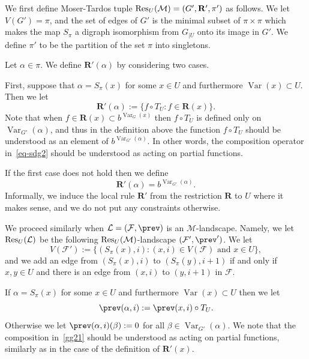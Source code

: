 \documentclass[12pt,a4paper]{article}
\numberwithin{equation}{section}
\theoremstyle{definition}
\newcommand{\al}{{\alpha}}
\newcommand{\be}{{\beta}}
\renewcommand{\cal}[1]{{\mathcal #1}}
\newcommand\Var{\operatorname{Var}}
\begin{document}
     We first define Moser-Tardos tuple $\Res_U(\cal M) = (G',\mathbf R', \pi')$ as follows. We let 
    $V(G')=\pi$, and the set of edges of $G'$ is the minimal subset of 
    $\pi\times \pi$ which makes the map $S_\pi$ a digraph isomorphism from 
    $G_{|U}$ onto its image in $G'$. We define $\pi'$ to be the partition of the set $\pi$ into singletons.
    
    Let $\al\in \pi$. We define $\mathbf R'(\al)$ by considering two cases. 
    
    First, suppose that $\al= S_\pi(x)$ for some $x\in U$ and furthermore $\Var(x)\subset U$. Then we let 
    \begin{equation}\label{eq-sdg2}
    \mathbf R' (\al) := \{f\circ T_U\colon f \in \mathbf R(x)\}.
    \end{equation}
    Note that when $f\in \mathbf R(x)\subset b^{\Var_G(x)}$ then $f\circ T_U$ is defined only on $\Var_{G'}(\al)$, and thus in the definition above the function $f\circ T_U$ should be understood as an element of $b^{\Var_{G'}(\al)}$. In other words, the composition operator in~\eqref{eq-sdg2} should be understood as acting on partial functions.
    
    If the first case does not hold then  we define 
    $$
    \mathbf R'(\al) = b^{\Var_{G'}(\al)}.
    $$
    Informally, we induce the local rule $\mathbf R'$ from the restriction $\mathbf R$ to $U$ where it makes sense, and  we do not put any constraints otherwise.
    
    We proceed similarly when $\cal L=(\cal F,\prev)$ is an $\cal 
    M$-landscape. Namely, we let $\Res_U(\cal L)$ be the following $\Res_U(\cal 
    M)$-landscape $(\cal F', \prev')$. We let 
    $$
        V(\cal F') := \{(S_\pi(x),i)\colon (x,i)\in V(\cal F) \text{ and } x\in U\},
    $$ 
    and we add an edge from $(S_\pi(x),i)$ to $(S_\pi(y),i+1)$ if and only if $x,y\in U$ and there is an edge from $(x,i)$ to $(y,i+1)$ in $\cal F$. 
    
    If $\al = S_\pi(x)$ for some $x\in U$ and furthermore $\Var(x) \subset U$ then we let 
    \begin{equation}\label{gg21}
        \prev(\al,i) := \prev(x,i)\circ T_U.
    \end{equation}
    Otherwise we let $\prev(\al,i)(\be) := 0$ for all $\be \in \Var_{G'}(\al)$. We note that the composition in~\eqref{gg21} should be understood as acting on partial functions, similarly as in the case of the definition of $\mathbf R'(x)$.
    
\end{document}
